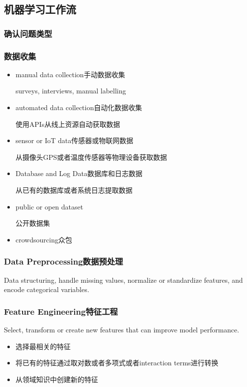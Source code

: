\documentclass[UTF8]{ctexart}
\begin{document}
\subsection{机器学习工作流}

\subsubsection{确认问题类型}

\subsubsection{数据收集}

\begin{itemize}
    \item manual data collection手动数据收集
    
    surveys, interviews, manual labelling
    \item automated data collection自动化数据收集
    
    使用APIs从线上资源自动获取数据
    \item sensor or IoT data传感器或物联网数据
    
    从摄像头GPS或者温度传感器等物理设备获取数据
    \item Database and Log Data数据库和日志数据
    
    从已有的数据库或者系统日志提取数据
    \item public or open dataset
    
    公开数据集

    \item crowdsourcing众包

\end{itemize}

\subsubsection{Data Preprocessing数据预处理}
Data structuring, handle missing values, normalize or standardize features, and encode categorical variables.

\subsubsection{Feature Engineering特征工程}
Select, transform or create new features that can improve model performance.
\begin{itemize}
    \item 选择最相关的特征
    \item 将已有的特征通过取对数或者多项式或者interaction terms进行转换
    \item 从领域知识中创建新的特征
\end{itemize}
\end{document}
